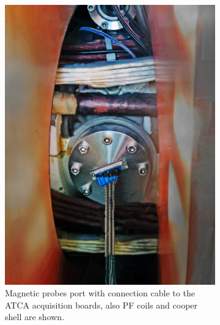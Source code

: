 \begin{figure}
	\centering
	\begin{subfigure}[b]{0.37\textwidth}
		\includegraphics[width=\textwidth]{Chp4/PuertoMirnov.png}
	\caption{\label{MirnPort}Magnetic probes port with connection cable to the ATCA acquisition boards, also PF coils and cooper shell are shown. }
	\end{subfigure}
~~~~
	\begin{subfigure}[b]{0.37\textwidth}

\end{subfigure}
\end{figure}
